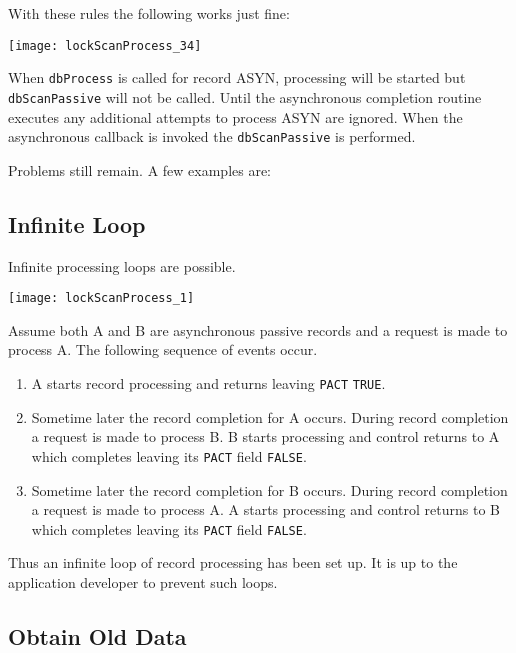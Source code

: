 With these rules the following works just fine:

\begin{center}
\texttt{[image: lockScanProcess\_34]}
\end{center}

When \verb|dbProcess| is called for record ASYN, processing will be started but \verb|dbScanPassive| will not be called.
Until the asynchronous completion routine executes any additional attempts to process ASYN are ignored.
When the asynchronous callback is invoked the \verb|dbScanPassive| is performed.

Problems still remain. A few examples are:

\subsection{Infinite Loop}

Infinite processing loops are possible.

\begin{center}
\texttt{[image: lockScanProcess\_1]}
\end{center}

Assume both A and B are asynchronous passive records and a request is made to process A.
The following sequence of events occur.

\begin{enumerate}
\item A starts record processing and returns leaving \verb|PACT| \verb|TRUE|.

\item Sometime later the record completion for A occurs.
During record completion a request is made to process B.
B starts processing and control returns to A which completes leaving its \verb|PACT| field \verb|FALSE|.

\item Sometime later the record completion for B occurs.
During record completion a request is made to process A.
A starts processing and control returns to B which completes leaving its \verb|PACT| field \verb|FALSE|.

\end{enumerate}

Thus an infinite loop of record processing has been set up.
It is up to the application developer to prevent such loops.

\subsection{Obtain Old Data}

